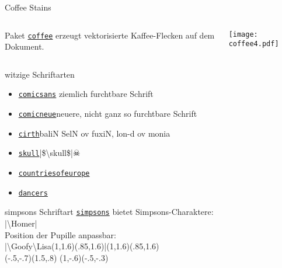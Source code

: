 \documentclass{beamer}
\newcommand{\pkg}[1]{\href{http://ctan.org/pkg/#1}{\alert{\texttt{#1}}}}
\begin{document}
\begin{frame}{Coffee Stains}
	\begin{columns}
		\begin{column}{.3\textwidth}
			Paket \alert{\href{http://hanno-rein.de/archives/349}{\texttt{coffee}}} erzeugt vektorisierte Kaffee-Flecken auf dem Dokument.
		\end{column}
		\begin{column}{.6\textwidth}
			\texttt{[image: coffee4.pdf]}
		\end{column}
	\end{columns}
\end{frame}



\begin{frame}{witzige Schriftarten}
	\begin{itemize}[<+->]
		\item \pkg{comicsans}\hfill{ ziemlich furchtbare Schrift}
		\item \pkg{comicneue}\hfill{\comicneue neuere, nicht ganz so furchtbare Schrift}
		\item \pkg{cirth}\hfill{\cirth baliN SelN ov fuxiN, lon-d ov monia}
		\vspace{.2ex}

		\item \pkg{skull}\hfill{|\$\textbackslash skull\$|\quad\Large$\skull$}
		\item \pkg{countriesofeurope}\hfill{\Large{}}
		\vspace{-.8em}

		\item \pkg{dancers}\hfill\scalebox{.6}{\dancers Sher­lock Holmes}\hspace{-2ex}\,
	\end{itemize}
\end{frame}

\begin{frame}{simpsons}
Schriftart \pkg{simpsons} bietet Simpsons-Charaktere:\\[-.5em]
|\textbackslash Homer| \hfill\Homer{} \\[2em]\pause\pause
Position der Pupille anpassbar:\\[-.5em]
|\textbackslash Goofy\textbackslash Lisa(1,1.6)(.85,1.6)|\hfill\Goofy\Lisa(1,1.6)(.85,1.6) \\[2em]
\pause
\hfill \Goofy\Marge(-.5,-.7)(1.5,.8) \Goofy\Maggie(1,-.6)(-.5,-.3) \quad \Left\Burns\hfill\,
\end{frame}
\end{document}
